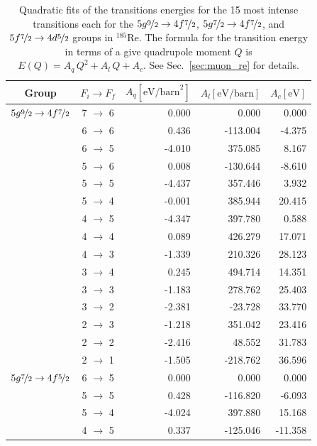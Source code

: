 \begin{table}[b]
\caption{\label{tab:re185energ}%
Quadratic fits of the transitions energies for the 15 most intense transitions each for the $5g\nicefrac{9}{2}\rightarrow4f\nicefrac{7}{2}$, $5g\nicefrac{7}{2}\rightarrow4f\nicefrac{7}{2}$, and $5f\nicefrac{7}{2}\rightarrow4d\nicefrac{5}{2}$ groups in $^{185}$Re. The formula for the transition energy in terms of a give quadrupole moment $Q$ is $E(Q)=A_q \, Q^2 + A_l \, Q + A_c$. See Sec.~\ref{sec:muon_re} for details.}
\centering
\begin{small}
\begin{tabular}{cc|rrr}
Group& $F_i \rightarrow F_f$ & $A_q [\text{eV/barn}^2]$ & $A_l [\text{eV/barn}]$ & $A_c [\text{eV}]$\\[1pt]\hline%
$5g\nicefrac{9}{2} \rightarrow 4f\nicefrac{7}{2}$ &7 $\rightarrow$ 6&0.000&0.000&0.000\\
&6 $\rightarrow$ 6&0.436&-113.004&-4.375\\
&6 $\rightarrow$ 5&-4.010&375.085&8.167\\
&5 $\rightarrow$ 6&0.008&-130.644&-8.610\\
&5 $\rightarrow$ 5&-4.437&357.446&3.932\\
&5 $\rightarrow$ 4&-0.001&385.944&20.415\\
&4 $\rightarrow$ 5&-4.347&397.780&0.588\\
&4 $\rightarrow$ 4&0.089&426.279&17.071\\
&4 $\rightarrow$ 3&-1.339&210.326&28.123\\
&3 $\rightarrow$ 4&0.245&494.714&14.351\\
&3 $\rightarrow$ 3&-1.183&278.762&25.403\\
&3 $\rightarrow$ 2&-2.381&-23.728&33.770\\
&2 $\rightarrow$ 3&-1.218&351.042&23.416\\
&2 $\rightarrow$ 2&-2.416&48.552&31.783\\
&2 $\rightarrow$ 1&-1.505&-218.762&36.596\\[10pt]
$5g\nicefrac{7}{2} \rightarrow 4f\nicefrac{5}{2}$ &6 $\rightarrow$ 5&0.000&0.000&0.000\\
&5 $\rightarrow$ 5&0.428&-116.820&-6.093\\
&5 $\rightarrow$ 4&-4.024&397.880&15.168\\
&4 $\rightarrow$ 5&0.337&-125.046&-11.358\\

\end{tabular}
\end{small}
\end{table}
